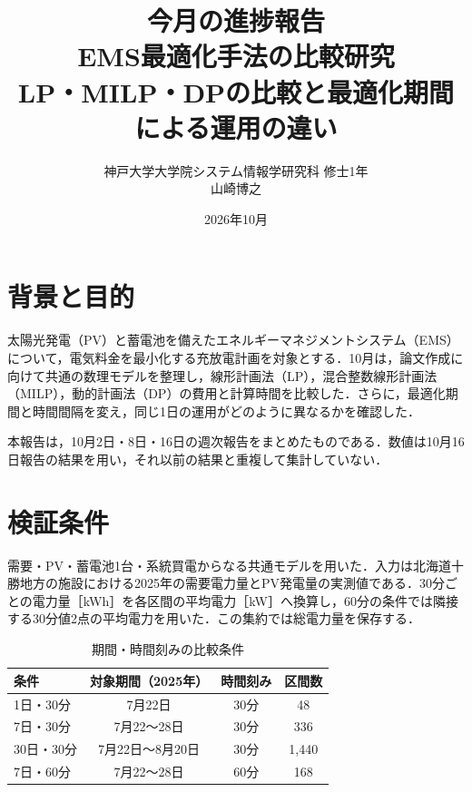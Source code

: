 \documentclass[a4paper,11pt,xelatex,ja=standard]{bxjsarticle}
\title{\vspace{-20mm}今月の進捗報告\\[0.5em]\large EMS最適化手法の比較研究\\LP・MILP・DPの比較と最適化期間による運用の違い}
\author{神戸大学大学院システム情報学研究科 修士1年\\山崎博之}
\date{2026年10月}
\begin{document}
\maketitle

\section{背景と目的}
太陽光発電（PV）と蓄電池を備えたエネルギーマネジメントシステム（EMS）について，電気料金を最小化する充放電計画を対象とする．10月は，論文作成に向けて共通の数理モデルを整理し，線形計画法（LP），混合整数線形計画法（MILP），動的計画法（DP）の費用と計算時間を比較した．さらに，最適化期間と時間間隔を変え，同じ1日の運用がどのように異なるかを確認した．

本報告は，10月2日・8日・16日の週次報告をまとめたものである．数値は10月16日報告の結果を用い，それ以前の結果と重複して集計していない．

\section{検証条件}
需要・PV・蓄電池1台・系統買電からなる共通モデルを用いた．入力は北海道十勝地方の施設における2025年の需要電力量とPV発電量の実測値である．30分ごとの電力量［kWh］を各区間の平均電力［kW］へ換算し，60分の条件では隣接する30分値2点の平均電力を用いた．この集約では総電力量を保存する．

\begin{table}[H]
    \centering
    \small
    \caption{期間・時間刻みの比較条件}
    \label{tab:conditions}
    \begin{tabular}{lccc}
        \toprule
        条件      & 対象期間（2025年） & 時間刻み & 区間数   \\
        \midrule
        1日・30分  & 7月22日       & 30分  & 48    \\
        7日・30分  & 7月22～28日    & 30分  & 336   \\
        30日・30分 & 7月22日～8月20日 & 30分  & 1,440 \\
        7日・60分  & 7月22～28日    & 60分  & 168   \\
        \bottomrule
    \end{tabular}
\end{table}
\end{document}
